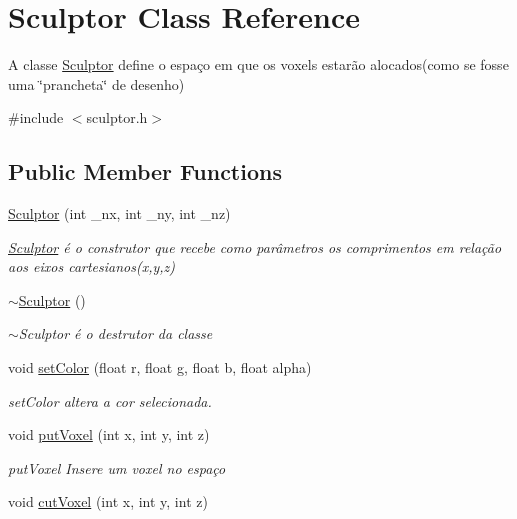 \hypertarget{class_sculptor}{}\section{Sculptor Class Reference}
\label{class_sculptor}


A classe \hyperlink{class_sculptor}{Sculptor} define o espaço em que os voxels estarão alocados(como se fosse uma \char`\"{}prancheta\char`\"{} de desenho)  




{\ttfamily \#include $<$sculptor.\+h$>$}

\subsection*{Public Member Functions}
\begin{DoxyCompactItemize}
\item 
\hyperlink{class_sculptor_a014e3ef5517bf0e9d9e14486b6ac6433}{Sculptor} (int \+\_\+nx, int \+\_\+ny, int \+\_\+nz)
\begin{DoxyCompactList}\small\item\em \hyperlink{class_sculptor}{Sculptor} é o construtor que recebe como parâmetros os comprimentos em relação aos eixos cartesianos(x,y,z) \end{DoxyCompactList}\item 
\hyperlink{class_sculptor_a8f159bf97458326f16d2e238e11be7ff}{$\sim$\+Sculptor} ()
\begin{DoxyCompactList}\small\item\em $\sim$\+Sculptor é o destrutor da classe \end{DoxyCompactList}\item 
void \hyperlink{class_sculptor_af1d69da01379874b0dfd6454787cb562}{set\+Color} (float r, float g, float b, float alpha)
\begin{DoxyCompactList}\small\item\em set\+Color altera a cor selecionada. \end{DoxyCompactList}\item 
void \hyperlink{class_sculptor_a4bdea3048b419d58e93074060eaa7b52}{put\+Voxel} (int x, int y, int z)
\begin{DoxyCompactList}\small\item\em put\+Voxel Insere um voxel no espaço \end{DoxyCompactList}\item 
void \hyperlink{class_sculptor_ad9d714a35fc8ae16d06eb5df37c3493c}{cut\+Voxel} (int x, int y, int z)

\end{DoxyCompactItemize}
